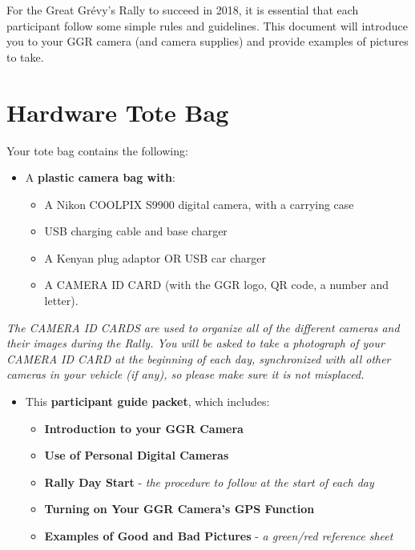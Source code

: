 For the Great Gr\'evy's Rally to succeed in 2018, it is essential that each participant follow some simple rules and guidelines.  This document will introduce you to your GGR camera (and camera supplies) and provide examples of pictures to take.

\section{Hardware Tote Bag}

\noindent Your tote bag contains the following:

\begin{itemize}
    \item A \textbf{plastic camera bag with}:
          \begin{itemize}
              \item A Nikon COOLPIX S9900 digital camera, with a carrying case
              \item USB charging cable and base charger
              \item A Kenyan plug adaptor OR USB car charger
              \item A CAMERA ID CARD (with the GGR logo, QR code, a number and letter).
          \end{itemize}
\end{itemize}

\noindent \textit{The CAMERA ID CARDS are used to organize all of the different cameras and their images during the Rally.  You will be asked to take a photograph of your CAMERA ID CARD at the beginning of each day, synchronized with all other cameras in your vehicle (if any), so please make sure it is not misplaced.}

\begin{itemize}
    \item This \textbf{participant guide packet}, which includes:
          \begin{itemize}
              \item \textbf{Introduction to your GGR Camera}
              \item \textbf{Use of Personal Digital Cameras}
              \item \textbf{Rally Day Start}  -  \textit{the procedure to follow at the start of each day}
              \item \textbf{Turning on Your GGR Camera's GPS Function}
              \item \textbf{Examples of Good and Bad Pictures}  -  \textit{a green/red reference sheet}
          \end{itemize}
\end{itemize}

